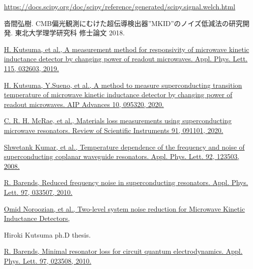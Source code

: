 \begin{thebibliography}{99}
\href{https://docs.scipy.org/doc/scipy/reference/generated/scipy.signal.welch.html}{
https://docs.scipy.org/doc/scipy/reference/generated/scipy.signal.welch.html
}

沓間弘樹. CMB偏光観測にむけた超伝導検出器”MKID”のノイズ低減法の研究開発. 東北大学理学研究科 修士論文 2018.

\href{https://aip.scitation.org/doi/10.1063/1.5110692}{
H. Kutsuma, et al., A measurement method for responsivity of microwave kinetic inductance detector by changing power of readout microwaves. Appl. Phys. Lett. 115, 032603, 2019.
}

\href{https://aip.scitation.org/doi/10.1063/5.0013946}{
H. Kutsuma, Y.Sueno, et al., A method to measure superconducting transition temperature of microwave kinetic inductance detector by changing power of readout microwaves. AIP Advances 10, 095320, 2020.
}

\href{https://arxiv.org/abs/2006.04718}{
  C. R. H. McRae, et al., Materials loss measurements using superconducting microwave resonators. Review of Scientific Instruments 91, 091101, 2020.
}

\href{https://aip.scitation.org/doi/pdf/10.1063/1.2894584?casa_token=wSixfQUGxAUAAAAA:CPs8YHoWwOGIVSeqJLakFz0-GQ9TLncU8veuICWpfjPBgZYTjr-WcUaiIv0cPRtaopytECg_taMS}{
  Shwetank Kumar, et al., Temperature dependence of the frequency and noise of superconducting coplanar waveguide resonators. Appl. Phys. Lett. 92, 123503, 2008.
}

\href{https://aip.scitation.org/doi/full/10.1063/1.3467052}
{R. Barends, Reduced frequency noise in superconducting resonators. Appl. Phys. Lett. 97, 033507, 2010.}

\href{https://arxiv.org/pdf/0909.2060.pdf}
{Omid Noroozian, et al., Two-level system noise reduction for Microwave Kinetic Inductance Detectors, }

Hiroki Kutsuma ph.D thesis.

\href{https://aip.scitation.org/doi/10.1063/1.3458705}
{R. Barends, Minimal resonator loss for circuit quantum electrodynamics. Appl. Phys. Lett. 97, 023508, 2010.}

  
\end{thebibliography}